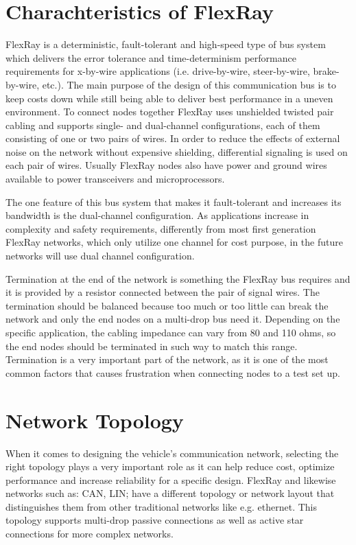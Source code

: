 \documentclass[conference]{IEEEtran}
\begin{document}
\section{Charachteristics of FlexRay}
FlexRay is a deterministic, fault-tolerant and high-speed type of bus system which delivers the error tolerance and time-determinism performance requirements for x-by-wire applications (i.e. drive-by-wire, steer-by-wire, brake-by-wire, etc.). The main purpose of the design of this communication bus is to keep costs down while still being able to deliver best performance in a uneven environment. To connect nodes together FlexRay uses unshielded twisted pair cabling and supports single- and dual-channel configurations, each of them consisting of one or two pairs of wires. In order to reduce the effects of external noise on the network without expensive shielding, differential signaling is used on each pair of wires. Usually FlexRay nodes also have power and ground wires available to power transceivers and microprocessors.

The one feature of this bus system that makes it fault-tolerant and increases its bandwidth is the dual-channel configuration. As applications increase in complexity and safety requirements, differently from most first generation FlexRay networks, which only utilize one channel for cost purpose, in the future networks will use dual channel configuration.

Termination at the end of the network is something the FlexRay bus requires and it is provided by a resistor connected between the pair of signal wires. The termination should be balanced because too much or too little can break the network and only the end nodes on a multi-drop bus need it. Depending on the specific application, the cabling impedance can vary from 80 and 110 ohms, so the end nodes should be terminated in such way to match this range. Termination is a very important part of the network, as it is one of the most common factors that causes frustration when connecting nodes to a test set up.

\section{Network Topology}
When it comes to designing the vehicle’s communication network, selecting the right topology plays a very important role as it can help reduce cost, optimize performance and increase reliability for a specific design.
FlexRay and likewise networks such as: CAN, LIN; have a different topology or network layout that distinguishes them from other traditional networks like e.g. ethernet. This topology supports multi-drop passive connections as well as active star connections for more complex networks.
\end{document}
